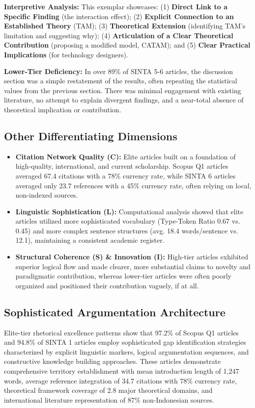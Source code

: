 \documentclass[journal,article,submit,pdftex,moreauthors]{Definitions/mdpi}
\begin{document}
\textbf{Interpretive Analysis:} This exemplar showcases: (1) \textbf{Direct Link to a Specific Finding} (the interaction effect); (2) \textbf{Explicit Connection to an Established Theory} (TAM); (3) \textbf{Theoretical Extension} (identifying TAM's limitation and suggesting why); (4) \textbf{Articulation of a Clear Theoretical Contribution} (proposing a modified model, CATAM); and (5) \textbf{Clear Practical Implications} (for technology designers).

\textbf{Lower-Tier Deficiency:} In over 89\% of SINTA 5-6 articles, the discussion section was a simple restatement of the results, often repeating the statistical values from the previous section. There was minimal engagement with existing literature, no attempt to explain divergent findings, and a near-total absence of theoretical implication or contribution.

\subsection{Other Differentiating Dimensions}

\begin{itemize}
\item \textbf{Citation Network Quality (C):} Elite articles built on a foundation of high-quality, international, and current scholarship. Scopus Q1 articles averaged 67.4 citations with a 78\% currency rate, while SINTA 6 articles averaged only 23.7 references with a 45\% currency rate, often relying on local, non-indexed sources.
\item \textbf{Linguistic Sophistication (L):} Computational analysis showed that elite articles utilized more sophisticated vocabulary (Type-Token Ratio 0.67 vs. 0.45) and more complex sentence structures (avg. 18.4 words/sentence vs. 12.1), maintaining a consistent academic register.
\item \textbf{Structural Coherence (S) \& Innovation (I):} High-tier articles exhibited superior logical flow and made clearer, more substantial claims to novelty and paradigmatic contribution, whereas lower-tier articles were often poorly organized and positioned their contribution vaguely, if at all.
\end{itemize}

\subsection{Sophisticated Argumentation Architecture}

Elite-tier rhetorical excellence patterns show that 97.2\% of Scopus Q1 articles and 94.8\% of SINTA 1 articles employ sophisticated gap identification strategies characterized by explicit linguistic markers, logical argumentation sequences, and constructive knowledge building approaches. These articles demonstrate comprehensive territory establishment with mean introduction length of 1,247 words, average reference integration of 34.7 citations with 78\% currency rate, theoretical framework coverage of 2.8 major theoretical domains, and international literature representation of 87\% non-Indonesian sources.
\end{document}
